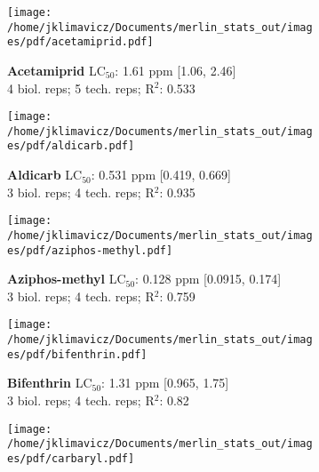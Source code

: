 \documentclass{article}
\author{James Klimavicz}
\date{\today}
\begin{document}
\begin{figure}[thp!]
   \begin{subfigure}{0.500\textwidth}
      \centering
      \texttt{[image: /home/jklimavicz/Documents/merlin\_stats\_out/images/pdf/acetamiprid.pdf]}
      \vspace{-0.05cm}
      \caption*{\textbf{Acetamiprid} LC$_{50}$: 1.61 ppm [1.06, 2.46] \\ 
4 biol. reps; 5 tech. reps; R$^2$: 0.533}
      \vspace{0.1cm}
   \end{subfigure}%
   \begin{subfigure}{0.500\textwidth}
      \centering
      \texttt{[image: /home/jklimavicz/Documents/merlin\_stats\_out/images/pdf/aldicarb.pdf]}
      \vspace{-0.05cm}
      \caption*{\textbf{Aldicarb} LC$_{50}$: 0.531 ppm [0.419, 0.669] \\ 
3 biol. reps; 4 tech. reps; R$^2$: 0.935}
      \vspace{0.1cm}
   \end{subfigure}%
\vspace{-0.1cm}
   \begin{subfigure}{0.500\textwidth}
      \centering
      \texttt{[image: /home/jklimavicz/Documents/merlin\_stats\_out/images/pdf/aziphos-methyl.pdf]}
      \vspace{-0.05cm}
      \caption*{\textbf{Aziphos-methyl} LC$_{50}$: 0.128 ppm [0.0915, 0.174] \\ 
3 biol. reps; 4 tech. reps; R$^2$: 0.759}
      \vspace{0.1cm}
   \end{subfigure}%
   \begin{subfigure}{0.500\textwidth}
      \centering
      \texttt{[image: /home/jklimavicz/Documents/merlin\_stats\_out/images/pdf/bifenthrin.pdf]}
      \vspace{-0.05cm}
      \caption*{\textbf{Bifenthrin} LC$_{50}$: 1.31 ppm [0.965, 1.75] \\ 
3 biol. reps; 4 tech. reps; R$^2$: 0.82}
      \vspace{0.1cm}
   \end{subfigure}%
\vspace{-0.1cm}
   \begin{subfigure}{0.500\textwidth}
      \centering
      \texttt{[image: /home/jklimavicz/Documents/merlin\_stats\_out/images/pdf/carbaryl.pdf]}

\end{subfigure}
\end{figure}
\end{document}
